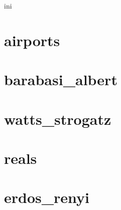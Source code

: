 ini
\section{airports}

\section{barabasi\_albert}

\section{watts\_strogatz}

\section{reals}

\section{erdos\_renyi}

